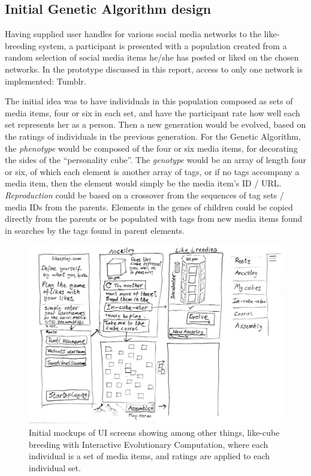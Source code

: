 \documentclass[]{article}
\begin{document}
\subsection{Initial Genetic Algorithm design}
\label{sec:InitialAlgorithm}

Having supplied user handles for various social media networks to the like-breeding system, a participant is presented with a population created from a random selection of social media items he/she has posted or liked on the chosen networks.  In the prototype discussed in this report, access to only one network is implemented:  Tumblr.

The initial idea was to have individuals in this population composed as sets of media items, four or six in each set, and have the participant rate how well each set represents her as a person.  Then a new generation would be evolved, based on the ratings of individuals in the previous generation.  For the Genetic Algorithm, the \textit{phenotype} would be composed of the four or six media items, for decorating the sides of the “personality cube”.  
The \textit{genotype} would be an array of length four or six, of which each element is another array of tags, or if no tags accompany a media item, then the element would simply be the media item's ID / URL.
\textit{Reproduction} could be based on a crossover from the sequences of tag sets / media IDs from the parents.  
Elements in the genes of children could be copied directly from the parents or be populated with tags from new media items found in searches by the tags found in parent elements.
\begin{figure}[h!]
	\centerline{\includegraphics[width=\columnwidth]{breederUImockup.png}}
	\caption{Initial mockups of UI screens showing among other things, like-cube breeding with Interactive Evolutionary Computation, where each individual is a set of media items, and ratings are applied to each individual set.}
	\label{fig:breedingMockup}
\end{figure}
\end{document}
